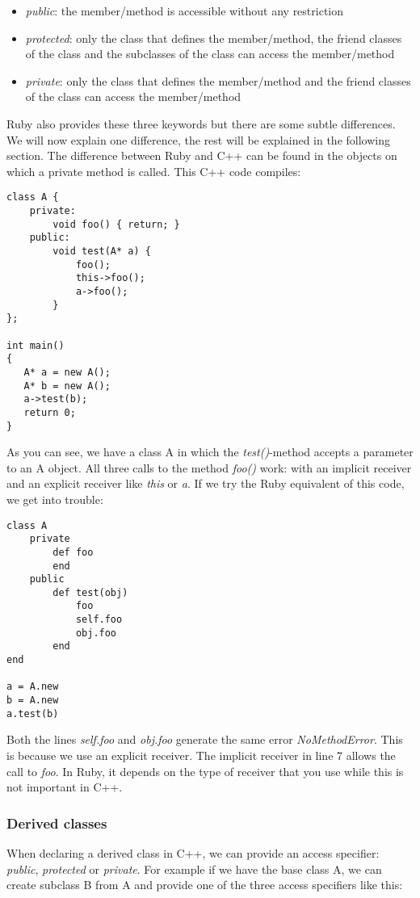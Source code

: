 \documentclass[10pt,a4paper,twocolumn]{article}
\begin{document}
\begin{itemize}
\item \textit{public}: the member/method is accessible without any restriction
\item \textit{protected}: only the class that defines the member/method, the friend classes of the class and the subclasses of the class can access the member/method
\item \textit{private}: only the class that defines the member/method and the friend classes of the class can access the member/method
\end{itemize}

Ruby also provides these three keywords but there are some subtle differences. We will now explain one difference, the rest will be explained in the following section. The difference between Ruby and C++ can be found in the objects on which a private method is called. This C++ code compiles:

\begin{lstlisting}
class A {
	private:
		void foo() { return; }
	public:
		void test(A* a) {
			foo();
			this->foo();
			a->foo();
		}
};
 
int main()
{
   A* a = new A();
   A* b = new A();
   a->test(b);
   return 0;
}
\end{lstlisting}

As you can see, we have a class A in which the \textit{test()}-method accepts a parameter to an A object. All three calls to the method \textit{foo()} work: with an implicit receiver and an explicit receiver like \textit{this} or \textit{a}. If we try the Ruby equivalent of this code, we get into trouble:

\begin{lstlisting}
class A
	private
		def foo
		end
	public
		def test(obj)
			foo
			self.foo
			obj.foo
		end
end

a = A.new
b = A.new
a.test(b)
\end{lstlisting}

Both the lines \textit{self.foo} and \textit{obj.foo} generate the same error \textit{NoMethodError}. This is because we use an explicit receiver. The implicit receiver in line 7 allows the call to \textit{foo}. In Ruby, it depends on the type of receiver that you use while this is not important in C++.

\subsubsection{Derived classes}
When declaring a derived class in C++, we can provide an access specifier: \textit{public}, \textit{protected} or \textit{private}. For example if we have the base class A, we can create subclass B from A and provide one of the three access specifiers like this:
\end{document}
